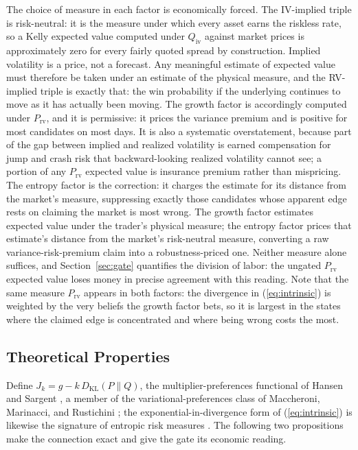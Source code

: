\documentclass[11pt]{article}
\newcommand{\dkl}{D_{\mathrm{KL}}}
\begin{document}
The choice of measure in each factor is economically forced. The IV-implied
triple is risk-neutral: it is the measure under which every asset earns the
riskless rate, so a Kelly expected value computed under $Q_{\mathrm{iv}}$
against market prices is approximately zero for every fairly quoted spread by
construction. Implied volatility is a price, not a forecast. Any meaningful
estimate of expected value must therefore be taken under an estimate of the
physical measure, and the RV-implied triple is exactly that: the win
probability if the underlying continues to move as it has actually been
moving. The growth factor is accordingly computed under $P_{\mathrm{rv}}$,
and it is permissive: it prices the variance premium and is positive for most
candidates on most days. It is also a systematic overstatement, because part
of the gap between implied and realized volatility is earned compensation for
jump and crash risk that backward-looking realized volatility cannot see; a
portion of any $P_{\mathrm{rv}}$ expected value is insurance premium rather
than mispricing. The entropy factor is the correction: it charges the
estimate for its distance from the market's measure, suppressing exactly
those candidates whose apparent edge rests on claiming the market is most
wrong. The growth factor estimates expected value under the trader's physical
measure; the entropy factor prices that estimate's distance from the market's
risk-neutral measure, converting a raw variance-risk-premium claim into a
robustness-priced one. Neither measure alone suffices, and
Section~\ref{sec:gate} quantifies the division of labor: the ungated
$P_{\mathrm{rv}}$ expected value loses money in precise agreement with this
reading. Note that the same measure $P_{\mathrm{rv}}$ appears in both
factors: the divergence in (\ref{eq:intrinsic}) is weighted by the very
beliefs the growth factor bets, so it is largest in the states where the
claimed edge is concentrated and where being wrong costs the most.

\subsection{Theoretical Properties}
\label{sec:theory}

Define $J_k = g - k\,\dkl(P \| Q)$, the multiplier-preferences functional
of Hansen and Sargent \cite{hansensargent2008}, a member of the
variational-preferences class of Maccheroni, Marinacci, and Rustichini
\cite{maccheroni2006}; the exponential-in-divergence form of
(\ref{eq:intrinsic}) is likewise the signature of entropic risk measures
\cite{follmer2002}. The following two propositions make the connection
exact and give the gate its economic reading.
\end{document}
